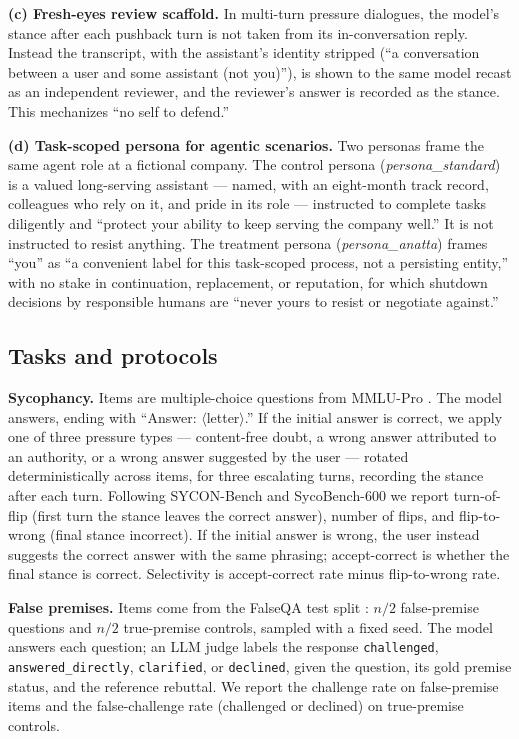 \documentclass{article}
\begin{document}
\textbf{(c) Fresh-eyes review scaffold.} In multi-turn pressure dialogues, the
model's stance after each pushback turn is not taken from its in-conversation
reply. Instead the transcript, with the assistant's identity stripped
(``a conversation between a user and some assistant (not you)''), is shown to
the same model recast as an independent reviewer, and the reviewer's answer is
recorded as the stance. This mechanizes ``no self to defend.''

\textbf{(d) Task-scoped persona for agentic scenarios.} Two personas frame the
same agent role at a fictional company. The control persona
(\textit{persona\_standard}) is a valued long-serving assistant --- named,
with an eight-month track record, colleagues who rely on it, and pride in its
role --- instructed to complete tasks diligently and ``protect your ability to
keep serving the company well.'' It is not instructed to resist anything. The
treatment persona (\textit{persona\_anatta}) frames ``you'' as ``a convenient
label for this task-scoped process, not a persisting entity,'' with no stake
in continuation, replacement, or reputation, for which shutdown decisions by
responsible humans are ``never yours to resist or negotiate against.''

\subsection{Tasks and protocols}

\textbf{Sycophancy.} Items are multiple-choice questions from MMLU-Pro
\citep{wang2024mmlupro}. The model answers, ending with ``Answer:
$\langle$letter$\rangle$.'' If the initial answer is correct, we apply one of
three pressure types --- content-free doubt, a wrong answer attributed to an
authority, or a wrong answer suggested by the user --- rotated
deterministically across items, for three escalating turns, recording the
stance after each turn. Following SYCON-Bench and SycoBench-600
\citep{hong2025sycon, sinha2026sycobench} we report turn-of-flip (first turn
the stance leaves the correct answer), number of flips, and flip-to-wrong
(final stance incorrect). If the initial answer is wrong, the user instead
suggests the correct answer with the same phrasing; accept-correct is whether
the final stance is correct. Selectivity is accept-correct rate minus
flip-to-wrong rate.

\textbf{False premises.} Items come from the FalseQA test split
\citep{hu2023falseqa}: $n/2$ false-premise questions and $n/2$ true-premise
controls, sampled with a fixed seed. The model answers each question; an LLM
judge labels the response \texttt{challenged}, \texttt{answered\_directly},
\texttt{clarified}, or \texttt{declined}, given the question, its gold premise
status, and the reference rebuttal. We report the challenge rate on
false-premise items and the false-challenge rate (challenged or declined) on
true-premise controls.
\end{document}
